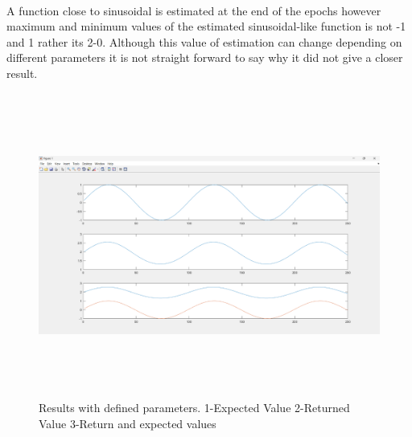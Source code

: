 \documentclass{article}
\begin{document}
\paragraph{}
A function close to sinusoidal is estimated at the end of the epochs however maximum and minimum values of the estimated sinusoidal-like function is not -1 and 1 rather its 2-0. Although this value of estimation can change depending on different parameters it is not straight forward to say why it did not give a closer result. 
\begin{figure}[h]
    \includegraphics[width=0.9\linewidth, height=10cm]{pics/results.png}
    \caption{Results with defined parameters. 1-Expected Value 2-Returned Value 3-Return and expected values}
    \label{fig:my_label}
\end{figure}
\end{document}
